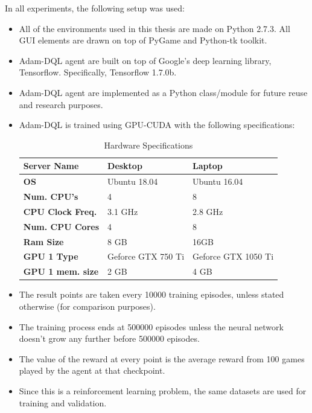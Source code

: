     In all experiments, the following setup was used:
    \begin{itemize}
        \item All of the environments used in this thesis are made on Python 2.7.3. All GUI elements are drawn on top of PyGame and Python-tk toolkit.
        \item Adam-DQL agent are built on top of Google's deep learning library, Tensorflow. Specifically, Tensorflow 1.7.0b.
        \item Adam-DQL agent are implemented as a Python class/module for future reuse and research purposes.
        \item Adam-DQL is trained using GPU-CUDA with the following specifications:
        \begin{table}[H]
            \centering
            
            \label{specs}
            \begin{tabular}{|l|l|l|}
            \hline
            \textbf{Server Name}     & \textbf{Desktop}    & \textbf{Laptop}     \\ \hline
            \textbf{OS}              & Ubuntu 18.04        & Ubuntu 16.04        \\ \cline{1-1}
            \textbf{Num. CPU's}      & 4                   & 8                   \\ \cline{1-1}
            \textbf{CPU Clock Freq.} & 3.1 GHz             & 2.8 GHz             \\ \cline{1-1}
            \textbf{Num. CPU Cores}  & 4                   & 8                   \\ \cline{1-1}
            \textbf{Ram Size}        & 8 GB                & 16GB                \\ \cline{1-1}
            \textbf{GPU 1 Type}      & Geforce GTX 750 Ti & Geforce GTX 1050 Ti \\ \cline{1-1}
            \textbf{GPU 1 mem. size} & 2 GB                & 4 GB                \\ \hline
            \end{tabular}
            \caption{Hardware Specifications}
        \end{table}
        \item The result points are taken every 10000 training episodes, unless stated otherwise (for comparison purposes).
        \item The training process ends at 500000 episodes unless the neural network doesn't grow any further before 500000 episodes.
        \item The value of the reward at every point is the average reward from 100 games played by the agent at that checkpoint.
        \item Since this is a reinforcement learning problem, the same datasets are used for training and validation.
    \end{itemize}
